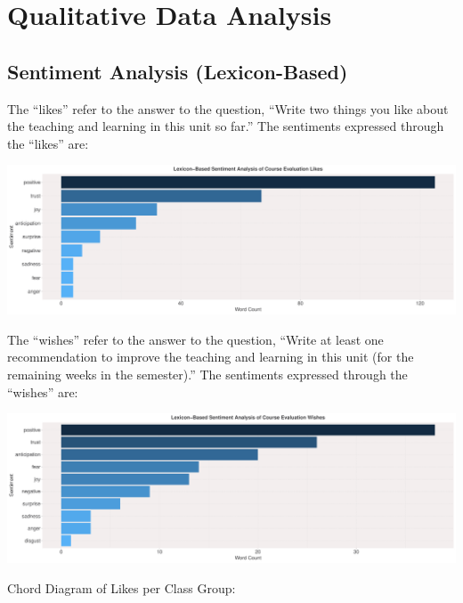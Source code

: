 \documentclass[
]{article}
\begin{document}
\newpage

\section{Qualitative Data Analysis}\label{qualitative-data-analysis}

\subsection{Sentiment Analysis
(Lexicon-Based)}\label{sentiment-analysis-lexicon-based}

The ``likes'' refer to the answer to the question, ``Write two things
you like about the teaching and learning in this unit so far.'' The
sentiments expressed through the ``likes'' are:

\includegraphics{10.b.BBT4206-End-SemesterCourseEvaluation-20230821-20231128-BI2-BBIT4-2_files/figure-latex/OverallSentimentForLikes-1.pdf}

The ``wishes'' refer to the answer to the question, ``Write at least one
recommendation to improve the teaching and learning in this unit (for
the remaining weeks in the semester).'' The sentiments expressed through
the ``wishes'' are:

\includegraphics{10.b.BBT4206-End-SemesterCourseEvaluation-20230821-20231128-BI2-BBIT4-2_files/figure-latex/OverallSentimentForWishes-1.pdf}

\newpage

Chord Diagram of Likes per Class Group:
\end{document}

